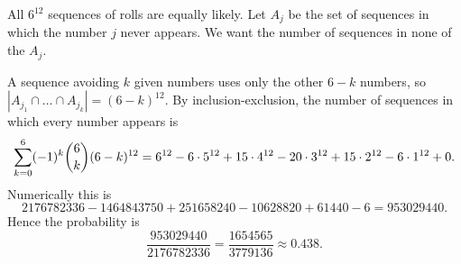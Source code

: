 All $6^{12}$ sequences of rolls are equally likely. Let $A_j$ be the set of sequences in which the number $j$ never appears. We want the number of sequences in none of the $A_j$.

A sequence avoiding $k$ given numbers uses only the other $6-k$ numbers, so $|A_{j_1}\cap\dots\cap A_{j_k}|=(6-k)^{12}$. By inclusion-exclusion, the number of sequences in which every number appears is
\[
\sum_{k=0}^{6}(-1)^k\dbinom6k(6-k)^{12}=6^{12}-6\cdot5^{12}+15\cdot4^{12}-20\cdot3^{12}+15\cdot2^{12}-6\cdot1^{12}+0 .
\]
Numerically this is
\[
2176782336-1464843750+251658240-10628820+61440-6=953029440 .
\]
Hence the probability is
\[
\dfrac{953029440}{2176782336}=\boxed{\dfrac{1654565}{3779136}}\approx0.438 .
\]
